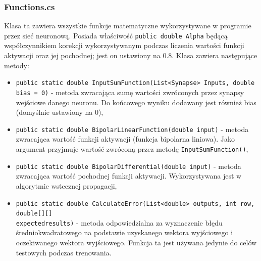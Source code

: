 \documentclass[12pt,a4paper]{article}
\begin{document}
\subsubsection*{Functions.cs}
\hspace{20pt} Klasa ta zawiera wszystkie funkcje matematyczne wykorzystywane w programie przez sieć neuronową. Posiada właściwość \lstinline{public double Alpha} będącą współczynnikiem korekcji wykorzystywanym podczas liczenia wartości funkcji aktywacji oraz jej pochodnej; jest on ustawiony na 0.8. Klasa zawiera następujące metody:
    \begin{itemize}
        \item \lstinline{public static double InputSumFunction(List<Synapse> Inputs, double bias = 0)} - metoda zwracająca sumę wartości zwróconych przez synapsy wejściowe danego neuronu. Do końcowego wyniku dodawany jest również bias (domyślnie ustawiony na 0),
        \item \lstinline{public static double BipolarLinearFunction(double input)} - metoda zwracająca wartość funkcji aktywacji (funkcja bipolarna liniowa). Jako argument przyjmuje wartość zwróconą przez metodę \lstinline{InputSumFunction()},
        \item \lstinline{public static double BipolarDifferential(double input)} - metoda zwracająca wartość pochodnej funkcji aktywacji. Wykorzystywana jest w algorytmie wstecznej propagacji,
        \item \lstinline{public static double CalculateError(List<double> outputs, int row, double[][]} \\ \lstinline{expectedresults)} - metoda odpowiedzialna za wyznaczenie błędu średniokwadratowego na podstawie uzyskanego wektora wyjściowego i oczekiwanego wektora wyjściowego. Funkcja ta jest używana jedynie do celów testowych podczas trenowania.
    \end{itemize}
\end{document}
